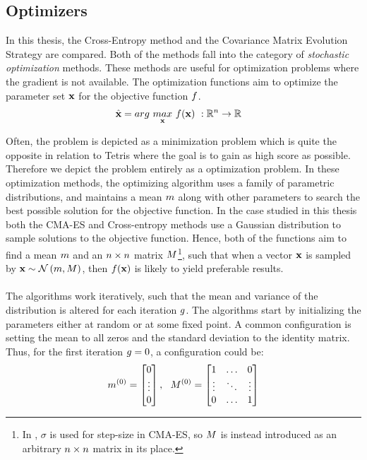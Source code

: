\subsection{Optimizers \label{Optimizers}}

In this thesis, the Cross-Entropy method and the Covariance Matrix Evolution 
Strategy are compared. Both of the methods fall into the category of 
\textit{stochastic optimization}
methods. These methods are useful for 
optimization problems where the gradient is not available.
The optimization functions aim to optimize 
the parameter set $\textbf{x}$
for the objective function $f$.
\begin{align}
\hat{\textbf{\individual }} &= 
arg \  \underset{\textbf{\individual }}{max} \  
\fitnessFunction (\textbf{\individual }) \ 
:\mathbb{R}^{\dimensions } \rightarrow \mathbb{R}
\end{align}

Often, the problem is depicted as a minimization problem which is quite
the opposite in relation to Tetris where the goal is to gain as high score as possible.
Therefore we depict the problem entirely as a optimization problem.
In these optimization methods, the optimizing algorithm uses a family of parametric distributions,
and maintains a mean $m $ along with other parameters
to search the best possible solution for the objective function.  
In the case studied in this thesis
both the CMA-ES and Cross-entropy methods use a 
Gaussian distribution to sample solutions to the objective function.
Hence, both of the functions aim to find a mean 
$m $ and an $n \times n$ matrix 
$M $\footnote{In \citep{hansen2011}, 
$\sigma$ is used for step-size in CMA-ES, so $M $ is instead introduced
as an arbitrary $n \times n$ matrix in its place.}, such that when
a vector $\textbf{x}$ is sampled by 
$\textbf{x} \sim \mathcal{N}\left( m, M \right)$, 
then $f (\textbf{x})$ 
is likely to yield preferable results.\\
\\
The algorithms work iteratively, such that the mean and variance 
of the distribution 
is altered for each iteration $g $.
The algorithms start by initializing the 
parameters either at random or at some fixed point. A common 
configuration is setting the mean to 
all zeros and the standard deviation to the identity matrix.
Thus, for the first iteration $g = 0$, a configuration could be:
\begin{align}
\mean^{(0)} =
\begin{bmatrix}
0\\
\vdots\\
0
\end{bmatrix},\ \ 
\varianceMatrix^{(0)} = 
\begin{bmatrix}
1 & \hdots & 0\\
\vdots & \ddots & \vdots\\
0 & \hdots & 1
\end{bmatrix}
\end{align}

